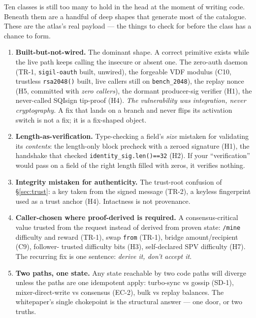 \documentclass[10pt,a4paper]{article}
\begin{document}
Ten classes is still too many to hold in the head at the moment of writing code. Beneath
them are a handful of deep shapes that generate most of the catalogue. These are the
atlas's real payload — the things to check for before the class has a chance to form.

\begin{enumerate}[leftmargin=1.5em,itemsep=5pt]
\item \textbf{Built-but-not-wired.} The dominant shape. A correct primitive exists while
the live path keeps calling the insecure or absent one. The zero-auth daemon (TR-1,
\texttt{sigil-oauth} built, unwired), the forgeable VDF modulus (C10, trustless
\texttt{rsa2048()} built, live callers still on \texttt{bench\_2048}), the replay nonce
(H5,  committed with \emph{zero callers}), the dormant
producer-sig verifier (H1), the never-called SQIsign tip-proof (H4). \emph{The
vulnerability was integration, never cryptography.} A fix that lands on a branch and
never flips its activation switch is not a fix; it is a fix-shaped object.

\item \textbf{Length-as-verification.} Type-checking a field's \emph{size} mistaken for
validating its \emph{contents}: the length-only block precheck with a zeroed signature
(H1), the handshake that checked \texttt{identity\_sig.len()==32} (H2). If your
``verification'' would pass on a field of the right length filled with zeros, it verifies
nothing.

\item \textbf{Integrity mistaken for authenticity.} The trust-root confusion of
\S\ref{sec:trust}: a key taken from the signed message (TR-2), a keyless fingerprint used
as a trust anchor (H4). Intactness is not provenance.

\item \textbf{Caller-chosen where proof-derived is required.} A consensus-critical value
trusted from the request instead of derived from proven state: \texttt{/mine} difficulty
and reward (TR-1), swap \texttt{from} (TR-1), bridge amount/recipient (C9), follower-
trusted difficulty bits (H3), self-declared SPV difficulty (H7). The recurring fix is one
sentence: \emph{derive it, don't accept it}.

\item \textbf{Two paths, one state.} Any state reachable by two code paths will diverge
unless the paths are one idempotent apply: turbo-sync vs gossip (SD-1), mixer-direct-write
vs consensus (EC-2), bulk vs replay balances. The whitepaper's single
 chokepoint is the structural answer — one door, or two
truths.


\end{enumerate}
\end{document}
